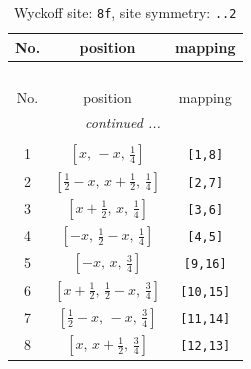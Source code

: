 \documentclass[fleqn,8pt]{jsarticle}
\begin{document}
\begin{longtable}{ccc}
\caption{Wyckoff site: {\tt 8f}, site symmetry: {\tt ..2}}
 \\
 \hline \hline
No. & position & mapping \\ \hline \endfirsthead

\multicolumn{2}{l}{\tablename\ \thetable{}} \\
 \hline \hline
No. & position & mapping \\ \hline \endhead

 \hline \hline
\multicolumn{2}{r}{\footnotesize\it continued ...} \\ \endfoot

 \hline \hline
\multicolumn{2}{r}{} \\ \endlastfoot

1 & $\left[ x,\, - x,\, \frac{1}{4} \right]$ & {\tt [1,8]} \\ \hline
2 & $\left[ \frac{1}{2} - x,\, x + \frac{1}{2},\, \frac{1}{4} \right]$ & {\tt [2,7]} \\ \hline
3 & $\left[ x + \frac{1}{2},\, x,\, \frac{1}{4} \right]$ & {\tt [3,6]} \\ \hline
4 & $\left[ - x,\, \frac{1}{2} - x,\, \frac{1}{4} \right]$ & {\tt [4,5]} \\ \hline
5 & $\left[ - x,\, x,\, \frac{3}{4} \right]$ & {\tt [9,16]} \\ \hline
6 & $\left[ x + \frac{1}{2},\, \frac{1}{2} - x,\, \frac{3}{4} \right]$ & {\tt [10,15]} \\ \hline
7 & $\left[ \frac{1}{2} - x,\, - x,\, \frac{3}{4} \right]$ & {\tt [11,14]} \\ \hline
8 & $\left[ x,\, x + \frac{1}{2},\, \frac{3}{4} \right]$ & {\tt [12,13]} \\
\end{longtable}
\renewcommand{\arraystretch}{1.2}
\end{document}
